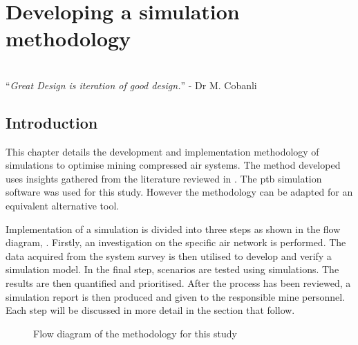 \chapter{Developing a simulation methodology}
\vspace{38em}
\hrulefill
\\
\enquote{\textit{Great Design is iteration of good design.}} - Dr M. Cobanli\\
\newpage
\section{Introduction}
This chapter details the development and implementation methodology of simulations to optimise mining compressed air systems. The method developed uses insights gathered from the literature reviewed in . The \gls{ptb} simulation software was used for this study. However the methodology can be adapted for an equivalent alternative tool.
\par 
Implementation of a simulation is divided into three steps as shown in the flow diagram, . Firstly, an investigation on the specific air network is performed. The data acquired from the system survey is then utilised to develop and verify a simulation model. In the final step, scenarios are tested using simulations. The results are then quantified and prioritised. After the process has been reviewed, a simulation report is then produced and given to the responsible mine personnel. Each step will be discussed in more detail in the section that follow.

\begin{figure}[h]
	\centering
	\caption{Flow diagram of the methodology for this study}
	\label{fig: Methodology}
\end{figure}
